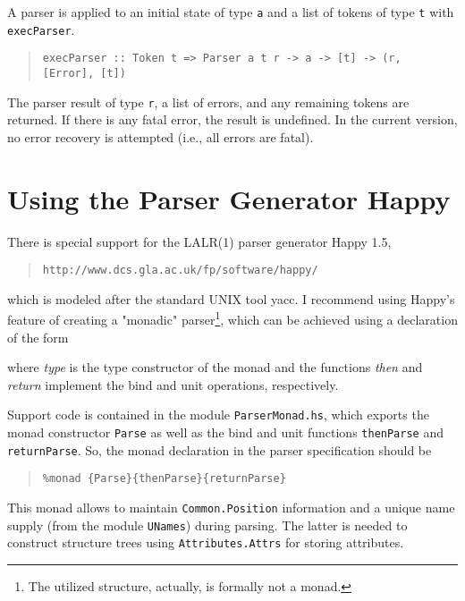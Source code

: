 \documentclass{report}
\newcommand{\code}[1]{\texttt{#1}}
\begin{document}
A parser is applied to an initial state of type \code{a} and a list of tokens
of type \code{t} with \code{execParser}.
%
\begin{quote}
\begin{verbatim}
execParser :: Token t => Parser a t r -> a -> [t] -> (r, [Error], [t])
\end{verbatim}
\end{quote}
%
The parser result of type \code{r}, a list of errors, and any remaining tokens
are returned.  If there is any fatal error, the result is undefined.  In the
current version, no error recovery is attempted (i.e., all errors are fatal).


\section{Using the Parser Generator Happy}

There is special support for the LALR(1) parser generator Happy 1.5,
%
\begin{quote}
  \texttt{http://www.dcs.gla.ac.uk/fp/software/happy/}
\end{quote}
%
which is modeled after the standard UNIX tool yacc.  I recommend using Happy's 
feature of creating a "monadic" parser\footnote{The utilized structure,
  actually, is formally not a monad.}, which can be achieved using a
declaration of the form
%
\begin{quote}
\begin{alltt}
%monad \{\textit{\rmfamily{}type}\}\{\textit{\rmfamily{}then}\}\{\textit{\rmfamily{}return}\}
\end{alltt}
\end{quote}
%
where \textit{type} is the type constructor of the monad and the functions
\textit{then} and \textit{return} implement the bind and unit operations,
respectively.

Support code is contained in the module \code{ParserMonad.hs}, which exports
the monad constructor \code{Parse} as well as the bind and unit functions
\code{thenParse} and \code{returnParse}.  So, the monad declaration in the
parser specification should be
%
\begin{quote}
\begin{verbatim}
%monad {Parse}{thenParse}{returnParse}
\end{verbatim}
\end{quote}
%
This monad allows to maintain \code{Common.Position} information and a unique
name supply (from the module \code{UNames}) during parsing.  The latter is
needed to construct structure trees using \code{Attributes.Attrs} for storing
attributes. 
\end{document}
